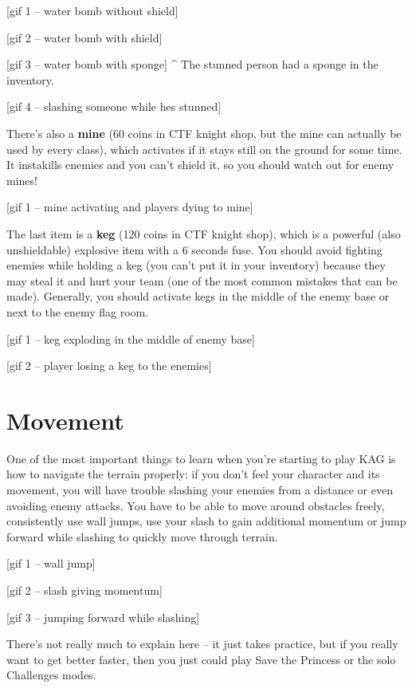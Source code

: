 \documentclass[]{book}
\begin{document}
{[}gif 1 -- water bomb without shield{]}

{[}gif 2 -- water bomb with shield{]}

{[}gif 3 -- water bomb with sponge{]}
\^{} The stunned person had a sponge in the inventory.

{[}gif 4 -- slashing someone while hes stunned{]}

There's also a \textbf{mine} (60 coins in CTF knight shop, but the mine can actually be used by every class), which activates if it stays still on the ground for some time. It instakills enemies and you can't shield it, so you should watch out for enemy mines!

{[}gif 1 -- mine activating and players dying to mine{]}

The last item is a \textbf{keg} (120 coins in CTF knight shop), which is a powerful (also unshieldable) explosive item with a 6 seconds fuse. You should avoid fighting enemies while holding a keg (you can't put it in your inventory) because they may steal it and hurt your team (one of the most common mistakes that can be made). Generally, you should activate kegs in the middle of the enemy base or next to the enemy flag room.

{[}gif 1 -- keg exploding in the middle of enemy base{]}

{[}gif 2 -- player losing a keg to the enemies{]}

\hypertarget{movement}{%
\section{Movement}\label{movement}}

One of the most important things to learn when you're starting to play KAG is how to navigate the terrain properly: if you don't feel your character and its movement, you will have trouble slashing your enemies from a distance or even avoiding enemy attacks. You have to be able to move around obstacles freely, consistently use wall jumps, use your slash to gain additional momentum or jump forward while slashing to quickly move through terrain.

{[}gif 1 -- wall jump{]}

{[}gif 2 -- slash giving momentum{]}

{[}gif 3 -- jumping forward while slashing{]}

There's not really much to explain here -- it just takes practice, but if you really want to get better faster, then you just could play Save the Princess or the solo Challenges modes.
\end{document}
